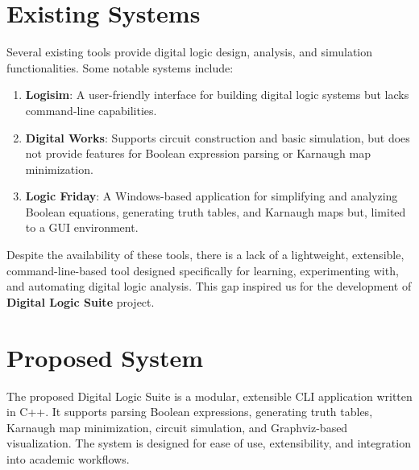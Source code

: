 \documentclass[a4paper,12pt]{article}
\begin{document}
\section{Existing Systems}
Several existing tools provide digital logic design, analysis, and simulation functionalities. Some notable systems include:
\renewcommand{\labelenumi}{\roman{enumi}.}
\begin{enumerate}
    \item \textbf{Logisim}: A user-friendly interface for building digital logic systems but lacks command-line capabilities.

    \item \textbf{Digital Works}: Supports circuit construction and basic simulation, but does not provide features for Boolean expression parsing or Karnaugh map minimization.

    \item \textbf{Logic Friday}: A Windows-based application for simplifying and analyzing Boolean equations, generating truth tables, and Karnaugh maps but, limited to a GUI environment.
\end{enumerate}

Despite the availability of these tools, there is a lack of a lightweight, extensible, command-line-based tool designed specifically for learning, experimenting with, and automating digital logic analysis. This gap inspired us for the development of \textbf{Digital Logic Suite} project.


\section{Proposed System}
The proposed Digital Logic Suite is a modular, extensible CLI application written in C++. It supports parsing Boolean expressions, generating truth tables, Karnaugh map minimization, circuit simulation, and Graphviz-based visualization. The system is designed for ease of use, extensibility, and integration into academic workflows.

\end{document}
